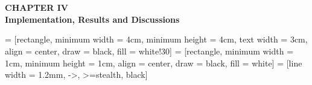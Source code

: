 \section*{}
\begin{center}
    {\fontsize{14}{1.5}\selectfont \textbf{CHAPTER IV}}\\
    \vspace{12pt}
    {\fontsize{16}{1.5}\selectfont \textbf{Implementation, Results and Discussions}}\\
    \vspace{12pt}
    \vspace{12pt}
\end{center}

\setcounter{section}{4}
\setcounter{subsection}{0}
\renewcommand{\theequation}{\thesection.\arabic{equation}}
\renewcommand{\thetable}{\thesection.\arabic{table}}
\renewcommand{\thefigure}{\thesection.\arabic{figure}}
\setcounter{table}{0}
\setcounter{figure}{0}

\setcounter{equation}{0}
\setlength{\parindent}{0pt}
\usetikzlibrary{positioning, shapes}
 = [rectangle, minimum width = 4cm, minimum height = 4cm, text width = 3cm, align = center, draw = black, fill = white!30]
 = [rectangle, minimum width = 1cm, minimum height = 1cm, align = center, draw = black, fill = white]
 = [line width = 1.2mm, ->, >=stealth, black]

